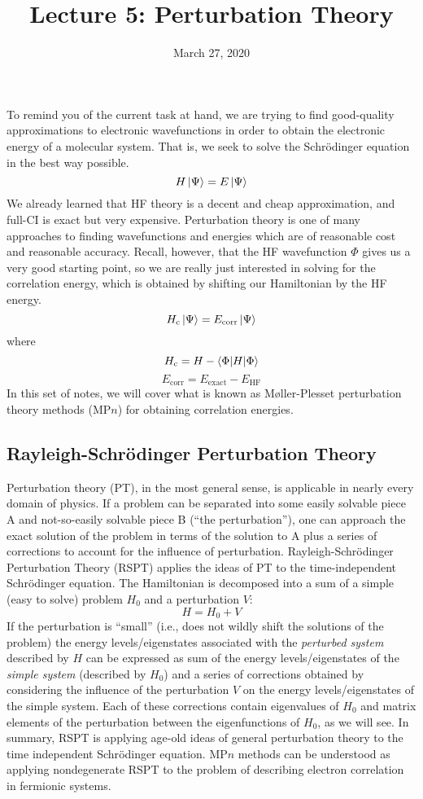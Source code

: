 \documentclass{article}
\title{Lecture 5: Perturbation Theory}
\date{March 27, 2020}
\newcommand{\Ecorr}{E_{\mathrm{corr}}}
\newcommand{\Hc}{H_{\mathrm{c}}}
\begin{document}
\maketitle
\noindent
To remind you of the current task at hand, we are trying to find good-quality approximations 
    to electronic wavefunctions in order to obtain the electronic energy of a molecular system. 
That is, we seek to solve the Schr{\"o}dinger equation in the best way possible.
\[H \ket{\Psi} = E \ket{\Psi} \]
We already learned that HF theory is a decent and cheap approximation, and full-CI is exact but very expensive. 
Perturbation theory is one of many approaches to finding wavefunctions and energies which are of 
    reasonable cost and reasonable accuracy.
Recall, however, that the HF wavefunction $\Phi$ gives us a very good starting point, so we are really just interested in solving for the correlation energy,
which is obtained by shifting our Hamiltonian by the HF energy.
\[\Hc \ket{\Psi} = \Ecorr \ket{\Psi} \]
where 
\[\Hc = H - \braket{\Phi| H | \Phi} \]
\[\Ecorr = E_{\mathrm{exact}} - E_{\mathrm{HF}}\]
In this set of notes, we will cover what is known as M{\o}ller-Plesset perturbation theory methods (MP$n$) 
    for obtaining correlation energies.

\subsection{Rayleigh-Schr{\"o}dinger Perturbation Theory}
Perturbation theory (PT), in the most general sense, is applicable in nearly every domain of physics. 
If a problem can be separated into some easily solvable piece A and not-so-easily solvable piece B 
    (``the perturbation''), one can approach the exact solution of the problem in terms of the solution to A 
    plus a series of corrections to account for the influence of perturbation.
Rayleigh-Schr{\"o}dinger Perturbation Theory (RSPT) applies the ideas of PT to the time-independent 
    Schr{\"o}dinger equation.
The Hamiltonian is decomposed into a sum of a simple (easy to solve) problem $H_0$ and a perturbation $V$:
\[H = H_0 + V \]
If the perturbation is ``small'' (i.e., does not wildly shift the solutions of the problem) the 
    energy levels/eigenstates associated with the \textit{perturbed system} described by $H$ can be expressed 
    as sum of the energy levels/eigenstates of  the \textit{simple system} (described by $H_0$) and a series 
    of corrections obtained by considering the influence of the perturbation $V$ on the 
    energy levels/eigenstates of the simple system.
Each of these corrections contain eigenvalues of $H_0$ and matrix elements of the perturbation 
    between the eigenfunctions of $H_0$, as we will see.
In summary, RSPT is applying age-old ideas of general perturbation theory to the
    time independent Schr{\"o}dinger equation.
MP$n$ methods can be understood as applying nondegenerate RSPT to the problem
    of describing electron correlation in fermionic systems. 
\end{document}
